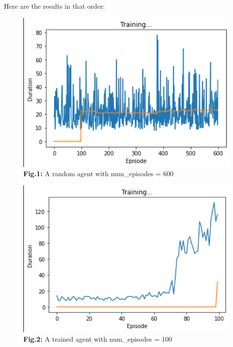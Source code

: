 \documentclass{article}
\numberwithin{equation}{section}
\numberwithin{equation}{section}
\begin{document}
Here are the results in that order:

\begin{figure}[H]
	\centering
	
	\includegraphics[width=\linewidth,cframe=blue 2.5pt 2.5pt]{random_agent.png}
	\\	
	\vspace{0.1in}
	\textbf{Fig.1:} A random agent with num\_episodes = 600
	\\
	\label{fig:Fig.1}
\end{figure}



\begin{figure}[H]
	\centering
	
	\includegraphics[width=\linewidth,cframe=blue 2.5pt 2.5pt]{agent100.png}
	\\	
	\vspace{0.1in}
	\textbf{Fig.2:} A trained agent with num\_episodes = 100
	\\
	\label{fig:Fig.2}
\end{figure}
\end{document}
